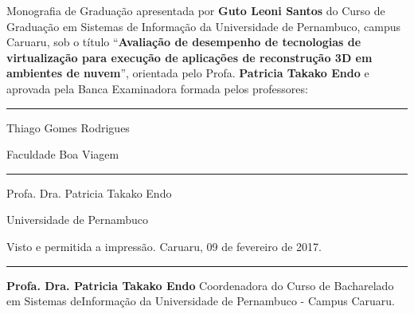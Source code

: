 
%
% 
%


\begin{folhadeaprovacao}

\noindent Monografia de Graduação apresentada por \textbf{Guto Leoni Santos} do Curso de Gradua\-ção em Sistemas de Informação da Universidade de Pernambuco, campus Caruaru, sob o título “\textbf{Avaliação de desempenho de tecnologias de virtualização para execução de aplicações de reconstrução 3D em ambientes de nuvem}”, orientada pelo Profa. \textbf{Patricia Takako Endo} e aprovada pela Banca Examinadora formada pelos professores:\vspace{4cm}



\begin{flushright}

\rule{300pt}{2pt}

Thiago Gomes Rodrigues

Faculdade Boa Viagem\vspace{1cm} 





\rule{300pt}{2pt}

Profa. Dra. Patricia Takako Endo

Universidade de Pernambuco\vspace{3cm} 

\end{flushright}

\begin{flushleft}

Visto e permitida a impressão.\newline
Caruaru, 09 de fevereiro de 2017.\vspace{1cm} 

\rule{300pt}{2pt}

\textbf{Profa. Dra. Patricia Takako Endo}\newline
Coordenadora do Curso de Bacharelado em Sistemas de\newline Informação da Universidade de Pernambuco - Campus Caruaru.
\end{flushleft}

  
\end{folhadeaprovacao}









